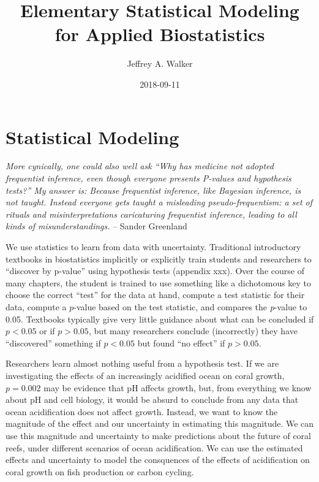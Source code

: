 \documentclass[]{book}
\title{Elementary Statistical Modeling for Applied Biostatistics}
\author{Jeffrey A. Walker}
\date{2018-09-11}
\theoremstyle{definition}
\theoremstyle{definition}
\theoremstyle{definition}
\theoremstyle{remark}
\begin{document}
\maketitle

{
\setcounter{tocdepth}{1}
\tableofcontents
}
\chapter{Statistical Modeling}\label{statistical-modeling}

\emph{More cynically, one could also well ask ``Why has medicine not
adopted frequentist inference, even though everyone presents P-values
and hypothesis tests?'' My answer is: Because frequentist inference,
like Bayesian inference, is not taught. Instead everyone gets taught a
misleading pseudo-frequentism: a set of rituals and misinterpretations
caricaturing frequentist inference, leading to all kinds of
misunderstandings.} -- Sander Greenland

We use statistics to learn from data with uncertainty. Traditional
introductory textbooks in biostatistics implicitly or explicitly train
students and researchers to ``discover by p-value'' using hypothesis
tests (appendix xxx). Over the course of many chapters, the student is
trained to use something like a dichotomous key to choose the correct
``test'' for the data at hand, compute a test statistic for their data,
compute a \(p\)-value based on the test statistic, and compares the
\emph{p}-value to 0.05. Textbooks typically give very little guidance
about what can be concluded if \(p < 0.05\) or if \(p > 0.05\), but many
researchers conclude (incorrectly) they have ``discovered'' something if
\(p < 0.05\) but found ``no effect'' if \(p > 0.05\).

Researchers learn almost nothing useful from a hypothesis test. If we
are investigating the effects of an increasingly acidified ocean on
coral growth, \(p=0.002\) may be evidence that pH affects growth, but,
from everything we know about pH and cell biology, it would be absurd to
conclude from any data that ocean acidification does not affect growth.
Instead, we want to know the magnitude of the effect and our uncertainty
in estimating this magnitude. We can use this magnitude and uncertainty
to make predictions about the future of coral reefs, under different
scenarios of ocean acidification. We can use the estimated effects and
uncertainty to model the consquences of the effects of acidification on
coral growth on fish production or carbon cycling.
\end{document}
